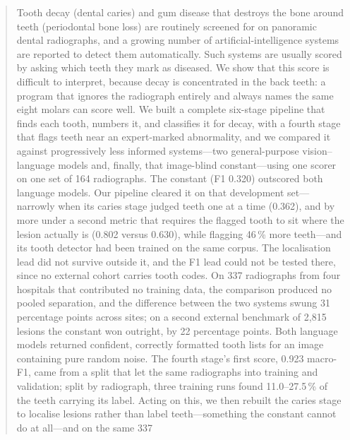 \documentclass[conference]{IEEEtran}
\begin{document}
\begin{abstract}
Tooth decay (dental caries) and gum disease that destroys the bone around teeth
(periodontal bone loss) are routinely screened for on panoramic dental
radiographs, and a growing number of artificial-intelligence systems are
reported to detect them automatically. Such systems are usually scored by
asking which teeth they mark as diseased. We show that this score is difficult
to interpret, because decay is concentrated in the back teeth: a program that
ignores the radiograph entirely and always names the same eight molars can score
well. We built a complete six-stage pipeline that finds each tooth, numbers it,
and classifies it for decay, with a fourth stage that flags teeth near an
expert-marked abnormality, and we compared it against
progressively less informed systems---two general-purpose
vision--language models and, finally, that image-blind constant---using one
scorer on one set of 164 radiographs. The constant (F1 0.320) outscored both
language models. Our pipeline cleared it on that development set---narrowly when
its caries stage judged teeth one at a time (0.362), and by more under a second
metric that requires the flagged tooth to sit where the lesion actually is (0.802
versus 0.630), while flagging 46\,\% more teeth---and its tooth detector had been
trained on the same corpus. The localisation lead did not survive outside it, and
the F1 lead could not be tested there, since no external cohort carries tooth codes.
On 337 radiographs from four hospitals that contributed no
training data, the comparison produced no pooled separation, and the difference
between the two systems swung 31 percentage points across sites; on a second
external benchmark of 2{,}815 lesions the constant won outright, by 22
percentage points. Both language
models returned confident, correctly formatted tooth lists for an image
containing pure random noise. The fourth stage's first score, 0.923 macro-F1,
came from a split that let the same radiographs into training and validation;
split by radiograph, three training runs found 11.0--27.5\,\% of the teeth
carrying its label.
Acting on this, we then rebuilt the caries stage to localise lesions rather than
label teeth---something the constant cannot do at all---and on the same 337

\end{abstract}
\end{document}
